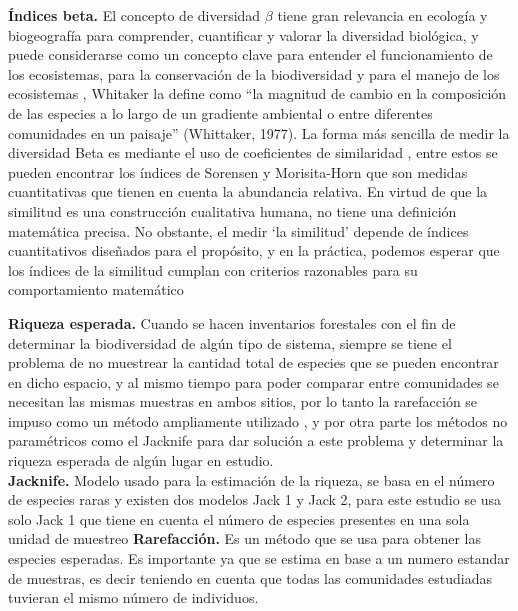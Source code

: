 \documentclass[conference,final,12pt,]{IEEEtran}
\begin{document}
\textbf{Índices beta.} El concepto de diversidad \(\beta\) tiene gran relevancia
en ecología y biogeografía para comprender, cuantificar y valorar la
diversidad biológica, y puede considerarse como un concepto clave para
entender el funcionamiento de los ecosistemas, para la conservación de
la biodiversidad y para el manejo de los ecosistemas \citep{O}, Whitaker
la define como ``la magnitud de cambio en la composición de las especies
a lo largo de un gradiente ambiental o entre diferentes comunidades en
un paisaje'' (Whittaker, 1977). La forma más sencilla de medir la
diversidad Beta es mediante el uso de coeficientes de similaridad
\citep{B}, entre estos se pueden encontrar los índices de Sorensen y
Morisita-Horn que son medidas cuantitativas que tienen en cuenta la
abundancia relativa. En virtud de que la similitud es una construcción
cualitativa humana, no tiene una definición matemática precisa. No
obstante, el medir `la similitud' depende de índices cuantitativos
diseñados para el propósito, y en la práctica, podemos esperar que los
índices de la similitud cumplan con criterios razonables para su
comportamiento matemático \citep{S}

\textbf{Riqueza esperada.} Cuando se hacen inventarios forestales con el
fin de determinar la biodiversidad de algún tipo de sistema, siempre se
tiene el problema de no muestrear la cantidad total de especies que se
pueden encontrar en dicho espacio, y al mismo tiempo para poder comparar
entre comunidades se necesitan las mismas muestras en ambos sitios, por
lo tanto la rarefacción se impuso como un método ampliamente utilizado
\citep{Z}, y por otra parte los métodos no paramétricos como el Jacknife
\citep{AA} para dar solución a este problema y determinar la riqueza
esperada de algún lugar en estudio.\\
\textbf{Jacknife.} Modelo usado para la estimación de la
riqueza\citep{X}, se basa en el número de especies raras y existen dos
modelos Jack 1 y Jack 2, para este estudio se usa solo Jack 1 que tiene
en cuenta el número de especies presentes en una sola unidad de
muestreo\citep{Y} \textbf{Rarefacción.} Es un método que se usa para
obtener las especies esperadas. Es importante ya que se estima en base a
un numero estandar de muestras, es decir teniendo en cuenta que todas
las comunidades estudiadas tuvieran el mismo número de
individuos.\citep{B}
\end{document}
